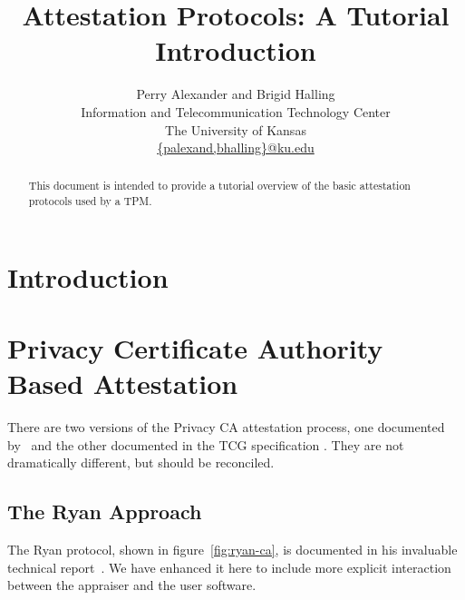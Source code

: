 \documentclass[10pt]{article}
\title{Attestation Protocols: A Tutorial Introduction}
\author{Perry Alexander and Brigid Halling \\ Information and
  Telecommunication Technology Center \\
  The University of Kansas \\
  \url{{palexand,bhalling}@ku.edu}}
\begin{document}
\maketitle
\tableofcontents
\listoffigures
\listoftables

\begin{abstract}
  This document is intended to provide a tutorial overview of the
  basic attestation protocols used by a TPM.
\end{abstract}

\section{Introduction}

\section{Privacy Certificate Authority Based Attestation}

There are two versions of the Privacy CA attestation process, one
documented by~\citet{Ryan:09:Introduction-to} and the other documented
in the TCG specification \citep{---::TCG-TPM-Specifi}.  They are not
dramatically different, but should be reconciled.

\subsection{The Ryan Approach}

The Ryan protocol, shown in figure~\ref{fig:ryan-ca}, is documented in
his invaluable technical report~\cite{Ryan:09:Introduction-to}.  We
have enhanced it here to include more explicit interaction between the
appraiser and the user software.  
\end{document}
